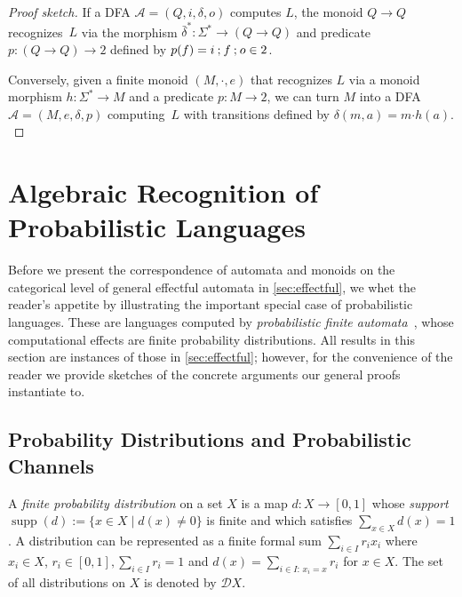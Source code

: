 \documentclass[a4paper, UKenglish, numberwithinsect, thm-restate, cleveref, final]{lipics-v2021}
\theoremstyle{plain}
\theoremstyle{definition}
\newcommand{\seq}{\ensuremath{\mathbin{\text{\upshape;}}}}
\newcommand{\D}{\ensuremath{\mathcal{D}}}
\newcommand{\mult}{\mathbin{\boldsymbol{\cdot}}}
\newcommand{\A}{\ensuremath{\mathcal{A}}\xspace}
\DeclareMathOperator{\supp}{supp}
\numberwithin{equation}{section}
\begin{document}
\begin{proof}[Proof sketch]
If a DFA $\A = (Q,i,\delta,o)$ computes $L$, the monoid $Q\to Q$ recognizes~$L$ via the morphism $\bar\delta^*\colon \Sigma^*\to (Q\to Q)$ and predicate $p\colon (Q\to Q)\to 2$ defined by $p(f) = i \seq f \seq o\in 2$.

Conversely, given a finite monoid $(M,\mult,e)$ that recognizes $L$ via a monoid morphism $h\colon \Sigma^*\to M$ and a predicate $p\colon M\to 2$, we can turn $M$ into a DFA $\A = (M, e, \delta, p)$ computing~$L$ with transitions defined by
\(
    \delta(m,a) = m\mult h(a).
\)
\end{proof}



\section{Algebraic Recognition of Probabilistic Languages}
\label{sec:fpa}

Before we present the correspondence of automata and monoids on the categorical level of
general effectful automata in \cref{sec:effectful}, we whet the reader's appetite by illustrating the important special case of probabilistic languages. These are languages computed
by \emph{probabilistic finite automata}~\cite{Rabin63}, whose computational effects are
finite probability distributions.  All results in this section are instances of 
those in \cref{sec:effectful}; however, for the convenience of the reader we provide sketches
of the concrete arguments our general proofs instantiate to.



\subsection{Probability Distributions and Probabilistic Channels}\label{sec:dist-monad}
A \emph{finite probability distribution} on a set $X$ is a map $d\colon X\to [0,1]$ whose \emph{support} $\supp(d):=\{x\in X \mid d(x)\neq 0\}$ is finite and which satisfies $\sum_{x\in X}d(x) = 1$. A distribution can be represented as a finite formal sum $\sum_{i\in I} r_i x_i$ where $x_i\in X$, $r_i\in [0,1], \sum_{i \in I} r_{i} = 1$ and $d(x)=\sum_{i\in I:\, x_i=x} r_i$ for $x\in X$. The set of all distributions on $X$ is denoted by \(\D X\).
\end{document}
